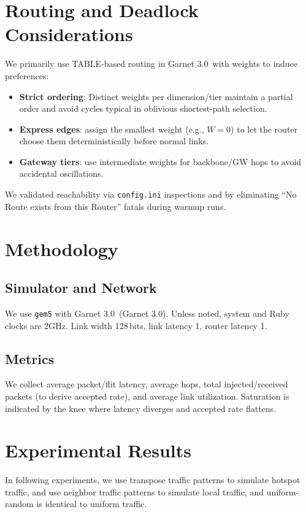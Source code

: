 \documentclass[11pt]{article}
\newcommand{\Ruby}{Garnet 3.0}
\newcommand{\LinkW}{128\,bits}
\newcommand{\LinkLat}{1}              %
\newcommand{\RouterLat}{1}            %
\begin{document}
\section{Routing and Deadlock Considerations}
We primarily use TABLE-based routing in \Ruby\ with weights to induce preferences:
\begin{itemize}[leftmargin=1em]
  \item \textbf{Strict ordering}: Distinct weights per dimension/tier maintain a partial order and avoid cycles typical in oblivious shortest-path selection.
  \item \textbf{Express edges}: assign the smallest weight (e.g., $W{=}0$) to let the router choose them deterministically before normal links.
  \item \textbf{Gateway tiers}: use intermediate weights for backbone/GW hops to avoid accidental oscillations.
\end{itemize}
We validated reachability via \texttt{config.ini} inspections and by eliminating ``No Route exists from this Router'' fatals during warmup runs.

\section{Methodology}
\subsection{Simulator and Network}
We use \texttt{gem5}  with \Ruby\ (Garnet 3.0). Unless noted, system and Ruby clocks are 2GHz. Link width \LinkW, link latency \LinkLat, router latency \RouterLat.



\subsection{Metrics}
We collect average packet/flit latency, average hops, total injected/received packets (to derive accepted rate), and average link utilization. Saturation is indicated by the knee where latency diverges and accepted rate flattens.

\section{Experimental Results}
In following experiments, we use transpose traffic patterns to simulate hotspot traffic, and use neighbor traffic patterns to simulate local traffic, and uniform-random is identical to uniform traffic.
\end{document}
